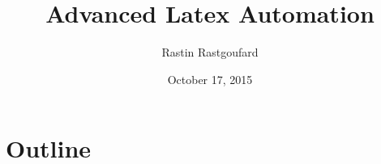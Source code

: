 \documentclass[compress]{beamer}
\title{%
Advanced Latex Automation}
\author[UNO]{Rastin Rastgoufard}
\date{October 17, 2015}
\begin{document}
\section*{Outline}

\subsection*{}
\begin{frame}[b]
\maketitle
\end{frame}


\end{document}

